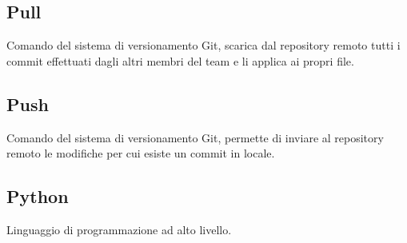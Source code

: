 \subsection{Pull}
Comando del sistema di versionamento Git, scarica dal repository remoto tutti i commit effettuati dagli altri membri del team e li applica ai propri file.

\subsection{Push}
Comando del sistema di versionamento Git, permette di inviare al repository remoto le modifiche per cui esiste un commit in locale.

\subsection{Python}
Linguaggio di programmazione ad alto livello.